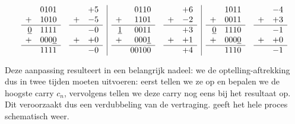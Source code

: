\begin{equation}
\begin{array}{rl|rl|rl}
\begin{array}{rr}
&0101\\
+&1010\\\hline
\underline{0}&1111\\
+&000\underline{0}\\\hline
&1111
\end{array}
&
\begin{array}{rr}
&+5\\
+&-5\\\hline
&-0\\
+&+0\\\hline
&-0
\end{array}
&
\begin{array}{rr}
&0110\\
+&1101\\\hline
\underline{1}&0011\\
+&000\underline{1}\\\hline
&00100
\end{array}
&
\begin{array}{rr}
&+6\\
+&-2\\\hline
&+3\\
+&+1\\\hline
&+4
\end{array}
&
\begin{array}{rr}
&1011\\
+&0011\\\hline
\underline{0}&1110\\
+&000\underline{0}\\\hline
&1110
\end{array}
&
\begin{array}{rr}
&-4\\
+&+3\\\hline
&-1\\
+&+0\\\hline
&-1
\end{array}
\end{array}
\eqnlab{oneComplementCorrectExample}
\end{equation}

Deze aanpassing resulteert in een belangrijk nadeel: we de optelling-aftrekking dus in twee tijden moeten uitvoeren: eerst tellen we ze op en bepalen we de hoogste carry $c_n$, vervolgens tellen we deze carry nog eens bij het resultaat op. Dit veroorzaakt dus een verdubbeling van de vertraging.  geeft het hele proces schematisch weer.

